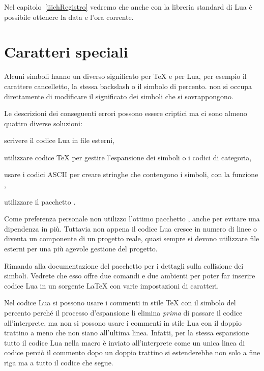 Nel capitolo~\ref{iiichRegistro} vedremo che anche con la libreria standard di
Lua è possibile ottenere la data e l'ora corrente.


\section{Caratteri speciali}

Alcuni simboli hanno un diverso significato per \TeX{} e per Lua, per esempio il
carattere cancelletto, la stessa backslash o il simbolo di percento. \LuaTeX{}
non si occupa direttamente di modificare il significato dei simboli che si
sovrappongono.

Le descrizioni dei conseguenti errori possono essere criptici ma ci sono almeno
quattro diverse soluzioni:
\begin{compactitemize}
\item scrivere il codice Lua in file esterni,
\item utilizzare codice \TeX{} per gestire l'espansione dei simboli o i codici
di categoria,
\item usare i codici ASCII per creare stringhe che contengono i simboli, con la
funzione ,
\item utilizzare il pacchetto .
\end{compactitemize}

Come preferenza personale non utilizzo l'ottimo pacchetto ,
anche per evitare una dipendenza in più. Tuttavia non appena il codice Lua
cresce in numero di linee o diventa un componente di un progetto reale, quasi
sempre si devono utilizzare file esterni per una più agevole gestione del
progetto.

Rimando alla documentazione del pacchetto  per i dettagli sulla
collisione dei simboli. Vedrete che esso offre due comandi e due ambienti per
poter far inserire codice Lua in un sorgente \LaTeX{} con varie impostazioni di
caratteri.

Nel codice Lua si possono usare i commenti in stile \TeX{} con il simbolo del
percento perché il processo d'espansione li elimina \emph{prima} di passare il
codice all'interprete, ma non si possono usare i commenti in stile Lua con il
doppio trattino a meno che non siano all'ultima linea. Infatti, per la stessa
espansione tutto il codice Lua nella macro  è inviato
all'interprete come un unica linea di codice perciò il commento dopo un doppio
trattino si estenderebbe non solo a fine riga ma a tutto il codice che segue.

